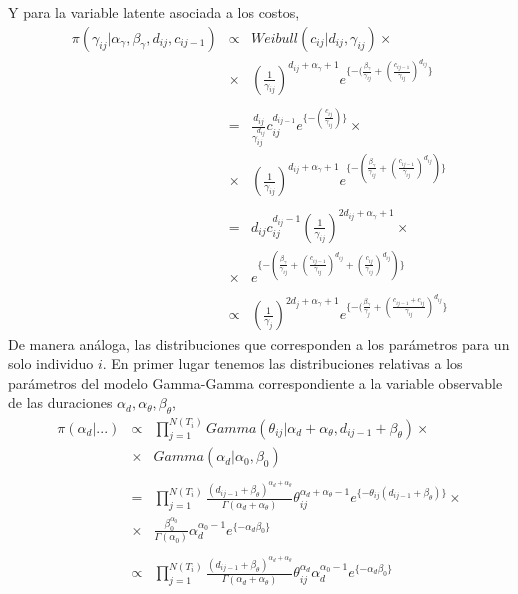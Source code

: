 Y para la variable latente asociada a los costos,
\begin{eqnarray*}
\pi(\gamma_{ij}|\alpha_\gamma,\beta_\gamma,d_{ij},c_{ij-1})&\propto& Weibull(c_{ij}|d_{ij},\gamma_{ij})\times\\
&\times& (\frac{1}{\gamma_{ij}})^{d_{ij} +\alpha_\gamma+1}e^{\{-(\frac{\beta_\gamma}{\gamma_{ij}}+(\frac{c_{ij-1}}{\gamma_{ij}})^{d_{ij}}\}}\\
\\
&=&\frac{d_{ij}}{\gamma_{ij}^{d_{ij}}}c_{ij}^{d_{ij-1}}e^{\{-(\frac{c_{ij}}{\gamma_{ij}})\}}\times\\
&\times&(\frac{1}{\gamma_{ij}})^{d_{ij}+\alpha_\gamma+1}e^{\{-(\frac{\beta_\gamma}{\gamma_{ij}}+(\frac{c_{ij-1}}{\gamma_{ij}})^{d_{ij}})\}}\\
\\
&=&d_{ij} c_{ij}^{d_{ij}-1}(\frac{1}{\gamma_{ij}})^{2d_{ij}+\alpha_\gamma+1}\times \\
&\times&e^{\{-(\frac{\beta_\gamma}{\gamma_{ij}}+(\frac{c_{ij-1}}{\gamma_{ij}})^{d_{ij}}+(\frac{c_{ij}}{\gamma_{ij}})^{d_{ij}})\}}\\
\\
&\propto&\left(\frac{1}{\gamma_j}\right)^{2d_j+\alpha_\gamma+1}e^{\{-(\frac{\beta_\gamma}{\gamma_j}+(\frac{c_{ij-1}+c_{ij}}{\gamma_{ij}})^{d_{ij}}\}}
\end{eqnarray*}
De manera an\'aloga, las distribuciones que corresponden a los par\'ametros para un solo individuo $i$. En primer lugar tenemos las distribuciones relativas a los par\'ametros del modelo Gamma-Gamma correspondiente a la variable observable de las duraciones $\alpha_d, \alpha_\theta, \beta_\theta$,
\begin{eqnarray*}
\pi(\alpha_d|...)&\propto& \prod_{j=1}^{N(T_i)} Gamma(\theta_{ij}|\alpha_d+\alpha_\theta,d_{ij-1}+\beta_\theta)\times\\
&\times& Gamma(\alpha_d|\alpha_0,\beta_0)\\
\\
&=&\prod_{j=1}^{N(T_i)}\frac{(d_{ij-1}+\beta_\theta)^{\alpha_d+\alpha_\theta}}{\Gamma(\alpha_d+\alpha_\theta)} \theta_{ij}^{\alpha_d+\alpha_\theta-1} e^{\{-\theta_{ij}(d_{ij-1}+\beta_\theta)\}}\times\\
&\times&\frac{\beta_0^{\alpha_0}}{\Gamma(\alpha_0)} \alpha_d^{\alpha_0-1}e^{\{-\alpha_d\beta_0\}}\\
\\
&\propto&\prod_{j=1}^{N(T_i)}\frac{(d_{ij-1}+\beta_\theta)^{\alpha_d+\alpha_\theta}}{\Gamma(\alpha_d+\alpha_\theta)} \theta_{ij}^{\alpha_d}\alpha_d^{\alpha_0-1}e^{\{-\alpha_d\beta_0\}}
\end{eqnarray*}
